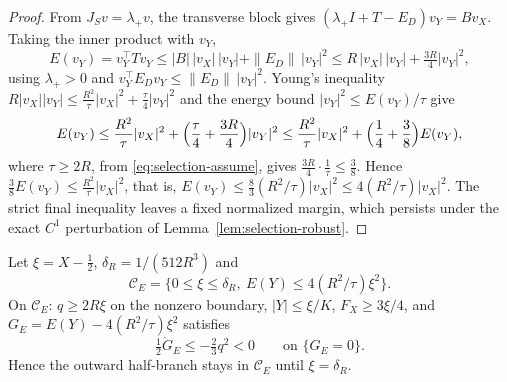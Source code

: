 \begin{proof}
From $J_Sv=\lambda_+v$, the transverse block gives $(\lambda_+I+T-E_D)v_Y=Bv_X$. Taking the inner product with $v_Y$,
\[
E(v_Y)=v_Y^{\top}Tv_Y\le|B|\,|v_X|\,|v_Y|+\|E_D\|\,|v_Y|^2\le R\,|v_X|\,|v_Y|+\tfrac{3R}4|v_Y|^2,
\]
using $\lambda_+>0$ and $v_Y^{\top}E_Dv_Y\le\|E_D\|\,|v_Y|^2$. Young's inequality $R|v_X||v_Y|\le\frac{R^2}\tau|v_X|^2+\frac\tau4|v_Y|^2$ and the energy bound $|v_Y|^2\le E(v_Y)/\tau$ give
\[
E(v_Y)\le\frac{R^2}\tau|v_X|^2+\Bigl(\frac\tau4+\frac{3R}4\Bigr)|v_Y|^2\le\frac{R^2}\tau|v_X|^2+\Bigl(\frac14+\frac38\Bigr)E(v_Y),
\]
where $\tau\ge2R$, from \eqref{eq:selection-assume}, gives $\frac{3R}4\cdot\frac1\tau\le\frac38$. Hence $\frac38E(v_Y)\le\frac{R^2}\tau|v_X|^2$, that is, $E(v_Y)\le\frac83(R^2/\tau)|v_X|^2\le4(R^2/\tau)|v_X|^2$. The strict final inequality leaves a fixed normalized margin, which persists under the exact $C^1$ perturbation of Lemma~\ref{lem:selection-robust}.
\end{proof}

\begin{lemma}\label{lem:selection-cone}
Let $\xi=X-\frac12$, $\delta_R=1/(512R^3)$ and
\[
\mathcal C_E=\bigl\{0\le\xi\le\delta_R,\ E(Y)\le4(R^2/\tau)\xi^2\bigr\}.
\]
On $\mathcal C_E$: $q\ge2R\xi$ on the nonzero boundary, $|Y|\le\xi/K$, $F_X\ge3\xi/4$, and $G_E=E(Y)-4(R^2/\tau)\xi^2$ satisfies
\begin{equation}\label{eq:selection-coneflux}
\tfrac12\dot G_E\le-\tfrac23q^2<0\qquad\text{on }\{G_E=0\}.
\end{equation}
Hence the outward half-branch stays in $\mathcal C_E$ until $\xi=\delta_R$.
\end{lemma}

